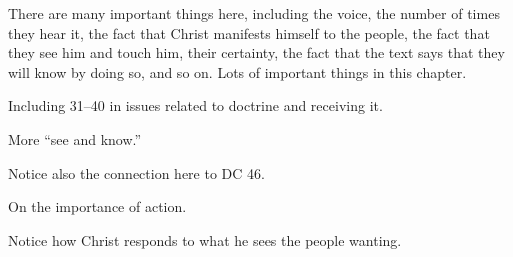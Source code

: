 \begin{compactdesc}
\begin{compactitem}
				\end{compactitem}
			\item[{\hyperref[3NEPHI-10-18]{3 Nephi 10:18--19}}]
			\item[{\hyperref[3NEPHI-11]{3 Nephi 11}}] \phantom{.}
				\begin{compactitem}
					\item There are many important things here, including the voice, the number of times they hear it, the fact that Christ manifests himself to the people, the fact that they see him and touch him, their certainty, the fact that the text says that they will know by doing so, and so on. Lots of important things in this chapter.
					\item Including 31--40 in issues related to doctrine and receiving it.
				\end{compactitem}
			\item[{\hyperref[3NEPHI-12-1]{3 Nephi 12:1--2}}] \phantom{.}
				\begin{compactitem}
					\item More ``see and know.''
					\item Notice also the connection here to DC 46.
				\end{compactitem}
			\item[{\hyperref[3NEPHI-14-7]{3 Nephi 14:7--8}}]
			\item[{\hyperref[3NEPHI-14-24]{3 Nephi 14:24--}}] \phantom{.}
				\begin{compactitem}
					\item On the importance of action.
				\end{compactitem}
			\item[{\hyperref[3NEPHI-15-18]{3 Nephi 15:18}}]
			\item[{\hyperref[3NEPHI-15-22]{3 Nephi 15:22--24}}]
			\item[{\hyperref[3NEPHI-16-1]{3 Nephi 16:1--4}}]
			\item[{\hyperref[3NEPHI-16-6]{3 Nephi 16:6--7}}]
			\item[{\hyperref[3NEPHI-16-10]{3 Nephi 16:10--12}}]
			\item[{\hyperref[3NEPHI-17-2]{3 Nephi 17:2--3}}]
			\item[{\hyperref[3NEPHI-17-5]{3 Nephi 17:5--8}}] \phantom{.}
				\begin{compactitem}
					\item Notice how Christ responds to what he sees the people wanting.
				\end{compactitem}
			\item[{\hyperref[3NEPHI-17-15]{3 Nephi 17:15--18}}]

\end{compactdesc}
